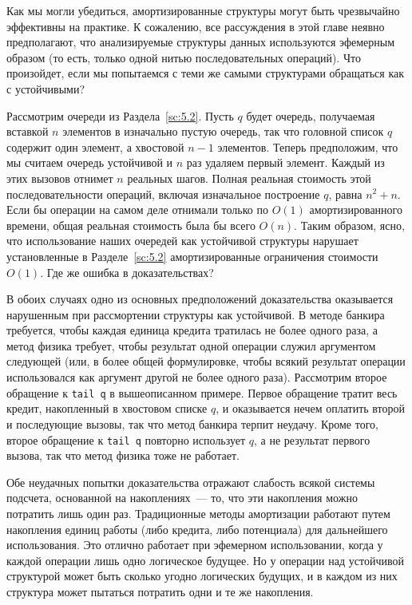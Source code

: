 Как мы могли убедиться, амортизированные структуры могут быть
чрезвычайно эффективны на практике. К сожалению, все рассуждения в
этой главе неявно предполагают, что анализируемые структуры данных
используются эфемерным образом (то есть, только одной нитью
последовательных операций). Что произойдет, если мы попытаемся с теми же
самыми структурами обращаться как с устойчивыми?

Рассмотрим очереди из Раздела~\ref{sc:5.2}. Пусть $q$ будет очередь,
получаемая вставкой $n$ элементов в изначально пустую очередь, так что
головной список $q$ содержит один элемент, а хвостовой $n - 1$
элементов. Теперь предположим, что мы считаем очередь устойчивой и $n$
раз удаляем первый элемент. Каждый из этих вызовов отнимет $n$
реальных шагов.  Полная реальная стоимость этой последовательности
операций, включая изначальное построение $q$, равна $n^2 + n$. Если бы
операции на самом деле отнимали только по $O(1)$ амортизированного
времени, общая реальная стоимость была бы всего $O(n)$. Таким образом,
ясно, что использование наших очередей как устойчивой структуры
нарушает установленные в Разделе~\ref{sc:5.2} амортизированные
ограничения стоимости $O(1)$. Где же ошибка в доказательствах?

В обоих случаях одно из основных предположений доказательства
оказывается нарушенным при рассмортении структуры как устойчивой. В
методе банкира требуется, чтобы каждая единица кредита тратилась не
более одного раза, а метод физика требует, чтобы результат одной
операции служил аргументом следующей (или, в более общей формулировке,
чтобы всякий результат операции использовался как аргумент другой не
более одного раза).  Рассмотрим второе обращение к \lstinline!tail q!
в вышеописанном примере. Первое обращение тратит весь кредит,
накопленный в хвостовом списке $q$, и оказывается нечем оплатить
второй и последующие вызовы, так что метод банкира терпит
неудачу. Кроме того, второе обращение к \lstinline!tail q! повторно
использует $q$, а не результат первого вызова, так что метод физика
тоже не работает.

Обе неудачных попытки доказательства отражают слабость всякой
системы подсчета, основанной на накоплениях~--- то, что эти накопления
можно потратить лишь один раз. Традиционные методы амортизации
работают путем накопления единиц работы (либо кредита, либо
потенциала) для дальнейшего использования. Это отлично работает при
эфемерном использовании, когда у каждой операции лишь одно логическое
будущее. Но у операции над устойчивой структурой может быть сколько угодно
логических будущих, и в каждом из них структура может пытаться потратить
одни и те же накопления.

